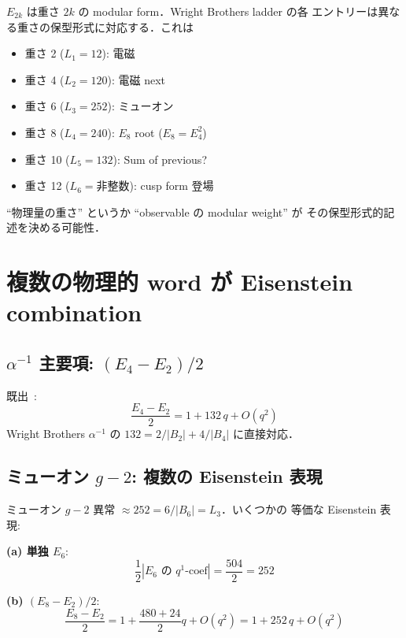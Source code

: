 \documentclass[11pt,a4paper]{article}
\begin{document}
$E_{2k}$ は重さ $2k$ の modular form．Wright Brothers ladder の各
エントリーは異なる重さの保型形式に対応する．これは
\begin{itemize}
\item 重さ 2 ($L_1 = 12$): 電磁
\item 重さ 4 ($L_2 = 120$): 電磁 next
\item 重さ 6 ($L_3 = 252$): ミューオン
\item 重さ 8 ($L_4 = 240$): $E_8$ root ($E_8 = E_4^2$)
\item 重さ 10 ($L_5 = 132$): Sum of previous?
\item 重さ 12 ($L_6 = \text{非整数}$): cusp form 登場
\end{itemize}

``物理量の重さ'' というか ``observable の modular weight'' が
その保型形式的記述を決める可能性．

\section{複数の物理的 word が Eisenstein combination}

\subsection{$\alpha^{-1}$ 主要項: $(E_4 - E_2)/2$}

既出~\cite{kreimer-wb}:
\begin{equation}
\frac{E_4 - E_2}{2} = 1 + 132\, q + O(q^2)
\end{equation}
Wright Brothers $\alpha^{-1}$ の $132 = 2/|B_2| + 4/|B_4|$ に直接対応．

\subsection{ミューオン $g-2$: 複数の Eisenstein 表現}

ミューオン $g-2$ 異常 $\approx 252 = 6/|B_6| = L_3$．いくつかの
等価な Eisenstein 表現:

\textbf{(a) 単独 $E_6$}:
\begin{equation}
\frac{1}{2}|E_6 \text{ の } q^1\text{-coef}| = \frac{504}{2} = 252
\end{equation}

\textbf{(b) $(E_8 - E_2)/2$}:
\begin{equation}
\frac{E_8 - E_2}{2} = 1 + \frac{480 + 24}{2} q + O(q^2) = 1 + 252\, q + O(q^2)
\end{equation}
\end{document}
